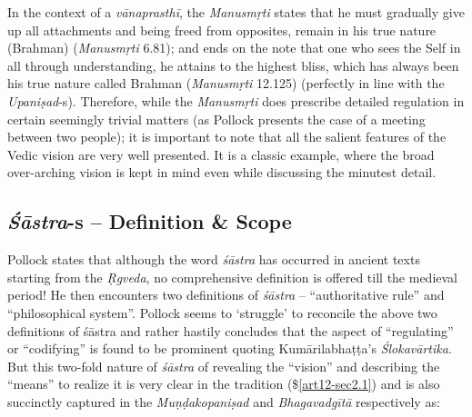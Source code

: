 In the context of a {\sl vānaprasthī}, the {\sl Manusmṛti} states that he must gradually give up all attachments and being freed from opposites, remain in his true nature (Brahman) ({\sl Manusmṛti} 6.81); and ends on the note that one who sees the Self in all through understanding, he attains to the highest bliss, which has always been his true nature called Brahman ({\sl Manusmṛti} 12.125) (perfectly in line with the {\sl Upaniṣad}-s). Therefore, while the {\sl Manusmṛti} does prescribe detailed regulation in certain seemingly trivial matters (as Pollock presents the case of a meeting between two people); it is important to note that all the salient features of the Vedic vision are very well presented. It is a classic example, where the broad over-arching vision is kept in mind even while discussing the minutest detail.

\newpage

\subsection{{{\sl\bfseries Śāstra}\relax}-s -- Definition \& Scope}\label{art12-sec3.4}

Pollock states that although the word {\sl śāstra} has occurred in ancient texts starting from the {\sl Ṛgveda}, no comprehensive deﬁnition is offered till the medieval period! He then encounters two deﬁnitions of {\sl śāstra} -- ``authoritative rule'' and ``philosophical system''. Pollock seems to `struggle' to reconcile the above two deﬁnitions of śāstra and rather hastily concludes that the aspect of ``regulating'' or ``codifying'' is found to be prominent quoting Kumārilabhaṭṭa's   {\sl Ślokavārtika}. But this two-fold nature of {\sl śāstra} of revealing the ``vision'' and describing the ``means'' to realize it is very clear in the tradition (\$\ref{art12-sec2.1}) and is also succinctly captured in the {\sl Muṇḍakopaniṣad} and {\sl Bhagavadgītā} respectively as: 


